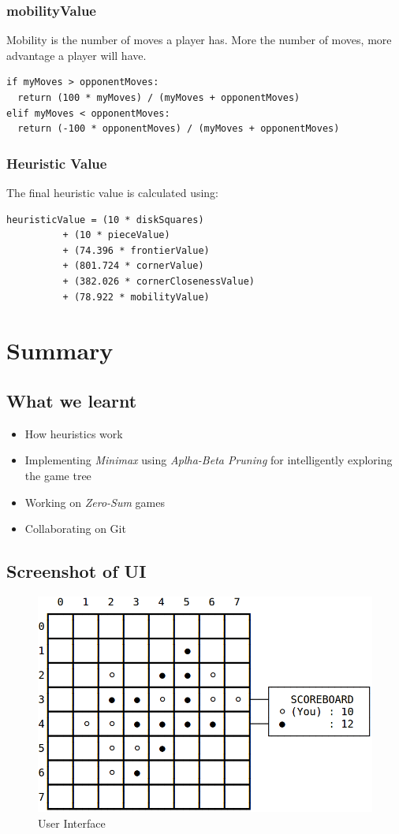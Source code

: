 \documentclass[a4paper,10pt]{article}
\begin{document}
\subsubsection*{mobilityValue}
Mobility is the number of moves a player has. More the number of moves, more advantage a player will have.
\begin{verbatim}
if myMoves > opponentMoves:
  return (100 * myMoves) / (myMoves + opponentMoves)
elif myMoves < opponentMoves:
  return (-100 * opponentMoves) / (myMoves + opponentMoves)
\end{verbatim}

\subsubsection*{Heuristic Value}
The final heuristic value is calculated using:
\begin{verbatim}
heuristicValue = (10 * diskSquares)
		  + (10 * pieceValue)
		  + (74.396 * frontierValue)
		  + (801.724 * cornerValue)
		  + (382.026 * cornerClosenessValue)
		  + (78.922 * mobilityValue)
\end{verbatim}
\newpage

\newpage
\section*{Summary}
\subsection*{What we learnt}
\begin{itemize}
	\item How heuristics work
	\item Implementing \textit{Minimax} using \textit{Aplha-Beta Pruning} for intelligently exploring the game tree
	\item Working on \textit{Zero-Sum} games
	\item Collaborating on Git
\end{itemize}

\subsection*{Screenshot of UI}
\begin{figure}[h]
  \centering
  \includegraphics[scale=0.45]{UI.png}
  \caption{User Interface}
\end{figure}
\end{document}
